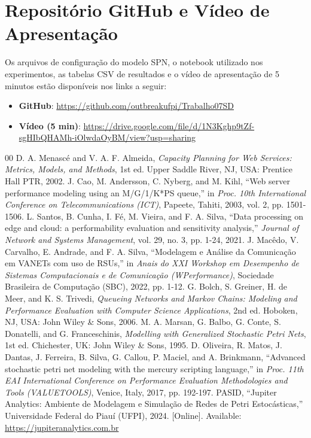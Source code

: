 \documentclass[conference,10pt]{IEEEtran}
\begin{document}
\section*{Repositório GitHub e Vídeo de Apresentação}
Os arquivos de configuração do modelo SPN, o notebook utilizado nos experimentos, as tabelas CSV de resultados e o vídeo de apresentação de 5 minutos estão disponíveis nos links a seguir:
\begin{itemize}
    \item \textbf{GitHub}: \url{https://github.com/outbreakufpi/Trabalho07SD}
    \item \textbf{Vídeo (5 min)}: \url{https://drive.google.com/file/d/1N3Kghp9tZf-sgHIbQHAMh-iOlwdaOyBM/view?usp=sharing}
\end{itemize}

\begin{thebibliography}{00}
 D. A. Menascé and V. A. F. Almeida, \textit{Capacity Planning for Web Services: Metrics, Models, and Methods}, 1st ed. Upper Saddle River, NJ, USA: Prentice Hall PTR, 2002.
 J. Cao, M. Andersson, C. Nyberg, and M. Kihl, ``Web server performance modeling using an M/G/1/K*PS queue,'' in \textit{Proc. 10th International Conference on Telecommunications (ICT)}, Papeete, Tahiti, 2003, vol. 2, pp. 1501-1506.
 L. Santos, B. Cunha, I. Fé, M. Vieira, and F. A. Silva, ``Data processing on edge and cloud: a performability evaluation and sensitivity analysis,'' \textit{Journal of Network and Systems Management}, vol. 29, no. 3, pp. 1-24, 2021.
 J. Macêdo, V. Carvalho, E. Andrade, and F. A. Silva, ``Modelagem e Análise da Comunicação em VANETs com uso de RSUs,'' in \textit{Anais do XXI Workshop em Desempenho de Sistemas Computacionais e de Comunicação (WPerformance)}, Sociedade Brasileira de Computação (SBC), 2022, pp. 1-12.
 G. Bolch, S. Greiner, H. de Meer, and K. S. Trivedi, \textit{Queueing Networks and Markov Chains: Modeling and Performance Evaluation with Computer Science Applications}, 2nd ed. Hoboken, NJ, USA: John Wiley \& Sons, 2006.
 M. A. Marsan, G. Balbo, G. Conte, S. Donatelli, and G. Franceschinis, \textit{Modelling with Generalized Stochastic Petri Nets}, 1st ed. Chichester, UK: John Wiley \& Sons, 1995.
 D. Oliveira, R. Matos, J. Dantas, J. Ferreira, B. Silva, G. Callou, P. Maciel, and A. Brinkmann, ``Advanced stochastic petri net modeling with the mercury scripting language,'' in \textit{Proc. 11th EAI International Conference on Performance Evaluation Methodologies and Tools (VALUETOOLS)}, Venice, Italy, 2017, pp. 192-197.
 PASID, ``Jupiter Analytics: Ambiente de Modelagem e Simulação de Redes de Petri Estocásticas,'' Universidade Federal do Piauí (UFPI), 2024. [Online]. Available: \url{https://jupiteranalytics.com.br}
\end{thebibliography}
\end{document}
